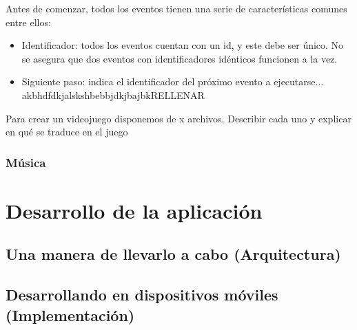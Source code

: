 Antes de comenzar, todos los eventos tienen una serie de características comunes entre ellos:

\begin{itemize}
	\item Identificador: todos los eventos cuentan con un id, y este debe ser único. No se asegura que dos eventos con identificadores idénticos funcionen a la vez.
	\item Siguiente paso: indica el identificador del próximo evento a ejecutarse...
	akbhdfdkjalskshbebbjdkjbajbkRELLENAR
\end{itemize}

Para crear un videojuego disponemos de x archivos.
Describir cada uno y explicar en qué se traduce en el juego

\subsection{Música}

\chapter{Desarrollo de la aplicación}

\section{Una manera de llevarlo a cabo (Arquitectura)}

\section{Desarrollando en dispositivos móviles (Implementación)}